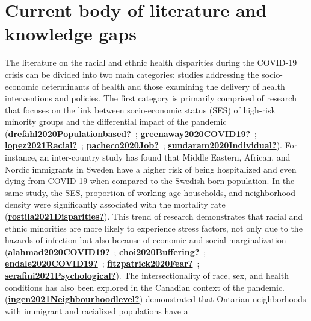 \documentclass[
]{article}
\begin{document}
\newpage

\newpage

\hypertarget{current-body-of-literature-and-knowledge-gaps-1}{%
\section{Current body of literature and knowledge gaps}\label{current-body-of-literature-and-knowledge-gaps-1}}

The literature on the racial and ethnic health disparities during the COVID-19
crisis can be divided into two main categories: studies addressing the
socio-economic determinants of health and those examining the delivery of health
interventions and policies. The first category is primarily comprised of
research that focuses on the link between socio-economic status (SES) of
high-risk minority groups and the differential impact of the pandemic
(\protect\hyperlink{ref-drefahl2020Populationbased}{\textbf{drefahl2020Populationbased?}}~; \protect\hyperlink{ref-greenaway2020COVID19}{\textbf{greenaway2020COVID19?}}~; \protect\hyperlink{ref-lopez2021Racial}{\textbf{lopez2021Racial?}}~; \protect\hyperlink{ref-pacheco2020Job}{\textbf{pacheco2020Job?}}~; \protect\hyperlink{ref-sundaram2020Individual}{\textbf{sundaram2020Individual?}}). For instance, an inter-country study
has found that Middle Eastern, African, and Nordic immigrants in Sweden have a
higher risk of being hospitalized and even dying from COVID-19 when compared to
the Swedish born population. In the same study, the SES, proportion of
working-age households, and neighborhood density were significantly associated
with the mortality rate (\protect\hyperlink{ref-rostila2021Disparities}{\textbf{rostila2021Disparities?}}). This trend of research
demonstrates that racial and ethnic minorities are more likely to experience
stress factors, not only due to the hazards of infection but also because of
economic and social marginalization (\protect\hyperlink{ref-alahmad2020COVID19}{\textbf{alahmad2020COVID19?}}~; \protect\hyperlink{ref-choi2020Buffering}{\textbf{choi2020Buffering?}}~; \protect\hyperlink{ref-endale2020COVID19}{\textbf{endale2020COVID19?}}~; \protect\hyperlink{ref-fitzpatrick2020Fear}{\textbf{fitzpatrick2020Fear?}}~; \protect\hyperlink{ref-serafini2021Psychological}{\textbf{serafini2021Psychological?}}). The
intersectionality of race, sex, and health conditions has also been explored in
the Canadian context of the pandemic. (\protect\hyperlink{ref-ingen2021Neighbourhoodlevel}{\textbf{ingen2021Neighbourhoodlevel?}}) demonstrated
that Ontarian neighborhoods with immigrant and racialized populations have a
\end{document}
